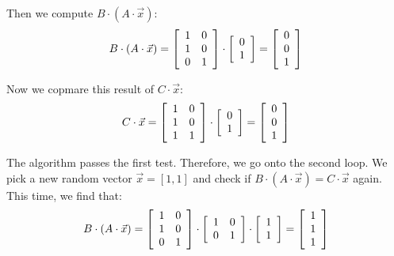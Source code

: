 \documentclass[psamsfonts]{amsart}
\newenvironment{sol}{{\bfseries Solution}}{\qedsymbol}
\theoremstyle{definition}
\theoremstyle{remark}
\numberwithin{equation}{section}
\begin{document}
\begin{sol}
Then we compute $B \cdot (A \cdot \vec{x})$:
\begin{equation}
B \cdot (A \cdot \vec{x}) = \left[ \begin{array}{c c}
1 & 0 \\
1 & 0 \\
0 & 1 
\end{array} \right] \cdot
\left[ \begin{array}{c}
0 \\
1 
\end{array} \right] =
\left[ \begin{array}{c}
0 \\ 
0 \\
1 
\end{array} \right]
\end{equation}

Now we copmare this result of $C \cdot \vec{x}$:
\begin{equation}
 C \cdot \vec{x} = \left[ \begin{array}{c c}
1 & 0 \\
1 & 0 \\
1 & 1 
\end{array} \right] \cdot 
\left[ \begin{array}{c}
0 \\
1 
\end{array} \right] =
\left[ \begin{array}{c}
0 \\
0 \\
1
\end{array} \right]
\end{equation}

The algorithm passes the first test. Therefore, we go onto the second loop. We pick a new random vector $\vec{x} = [1,1]$ and check if $B \cdot (A \cdot \vec{x}) = C \cdot \vec{x}$ again. This time, we find that:
\begin{equation}
B \cdot (A \cdot \vec{x})  =  \left[ \begin{array}{c c}
1 & 0 \\
1 & 0 \\
0 & 1 
\end{array} \right] \cdot 
\left[ \begin{array}{c c c}
1 & 0 \\
0 & 1 \\
\end{array} \right] \cdot 
\left[ \begin{array}{c}
1 \\
1
\end{array} \right] =
\left[ \begin{array}{c}
1 \\
1 \\ 
1 
\end{array} \right]
\end{equation}


\end{sol}
\end{document}
